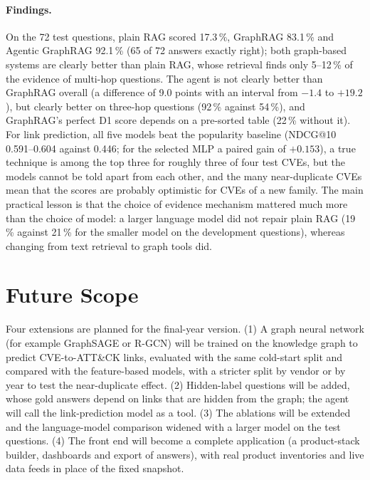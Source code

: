 \documentclass[12pt, a4paper]{article}
\newif\iffull      \fullfalse        %
\newif\ifshowtodo  \showtodofalse    %
\newcommand{\TODO}[1]{\ifshowtodo{\par\small\itshape\color{gray}[#1]\par}\fi}
\newcommand{\ATTCK}{ATT\&CK}
\begin{document}
\paragraph{Findings.} On the 72 test questions, plain RAG scored 17.3\,\%, GraphRAG 83.1\,\% and Agentic GraphRAG 92.1\,\% (65 of 72 answers exactly right); both graph-based systems are clearly better than plain RAG, whose retrieval finds only 5--12\,\% of the evidence of multi-hop questions. The agent is not clearly better than GraphRAG overall (a difference of 9.0 points with an interval from $-1.4$ to $+19.2$), but clearly better on three-hop questions (92\,\% against 54\,\%), and GraphRAG's perfect D1 score depends on a pre-sorted table (22\,\% without it). For link prediction, all five models beat the popularity baseline (NDCG@10 0.591--0.604 against 0.446; for the selected MLP a paired gain of $+0.153$), a true technique is among the top three for roughly three of four test CVEs, but the models cannot be told apart from each other, and the many near-duplicate CVEs mean that the scores are probably optimistic for CVEs of a new family. The main practical lesson is that the choice of evidence mechanism mattered much more than the choice of model: a larger language model did not repair plain RAG (19\,\% against 21\,\% for the smaller model on the development questions), whereas changing from text retrieval to graph tools did.

\section{Future Scope}
\iffull
\TODO{Short list of what remains after the final-year version.}
\else
Four extensions are planned for the final-year version. (1) A graph neural network (for example GraphSAGE or R-GCN) will be trained on the knowledge graph to predict CVE-to-\ATTCK{} links, evaluated with the same cold-start split and compared with the feature-based models, with a stricter split by vendor or by year to test the near-duplicate effect. (2) Hidden-label questions will be added, whose gold answers depend on links that are hidden from the graph; the agent will call the link-prediction model as a tool. (3) The ablations will be extended and the language-model comparison widened with a larger model on the test questions. (4) The front end will become a complete application (a product-stack builder, dashboards and export of answers), with real product inventories and live data feeds in place of the fixed snapshot.
\fi
\end{document}
